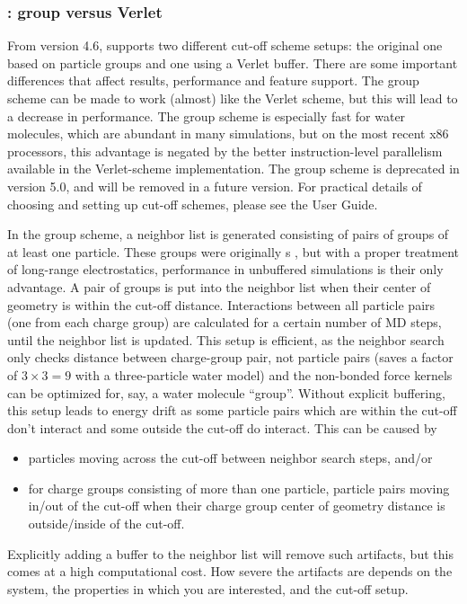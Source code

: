 \subsubsection{: group versus Verlet}
From version 4.6, {\gromacs} supports two different cut-off scheme
setups: the original one based on particle groups and one using a Verlet
buffer. There are some important differences that affect results,
performance and feature support. The group scheme can be made to work
(almost) like the Verlet scheme, but this will lead to a decrease in
performance. The group scheme is especially fast for water molecules,
which are abundant in many simulations, but on the most recent x86
processors, this advantage is negated by the better instruction-level
parallelism available in the Verlet-scheme implementation. The group
scheme is deprecated in version 5.0, and will be removed in a future
version. For practical details of choosing and setting up
cut-off schemes, please see the User Guide.

In the group scheme, a neighbor list is generated consisting of pairs
of groups of at least one particle. These groups were originally
s , but with a proper treatment of long-range
electrostatics, performance in unbuffered simulations is their only advantage. A pair of groups
is put into the neighbor list when their center of geometry is within
the cut-off distance. Interactions between all particle pairs (one from
each charge group) are calculated for a certain number of MD steps,
until the neighbor list is updated. This setup is efficient, as the
neighbor search only checks distance between charge-group pair, not
particle pairs (saves a factor of $3 \times 3 = 9$ with a three-particle water
model) and the non-bonded force kernels can be optimized for, say, a
water molecule ``group''. Without explicit buffering, this setup leads
to energy drift as some particle pairs which are within the cut-off don't
interact and some outside the cut-off do interact. This can be caused
by
\begin{itemize}
\item particles moving across the cut-off between neighbor search steps, and/or
\item for charge groups consisting of more than one particle, particle pairs
  moving in/out of the cut-off when their charge group center of
  geometry distance is outside/inside of the cut-off.
\end{itemize}
Explicitly adding a buffer to the neighbor list will remove such
artifacts, but this comes at a high computational cost. How severe the
artifacts are depends on the system, the properties in which you are
interested, and the cut-off setup.

